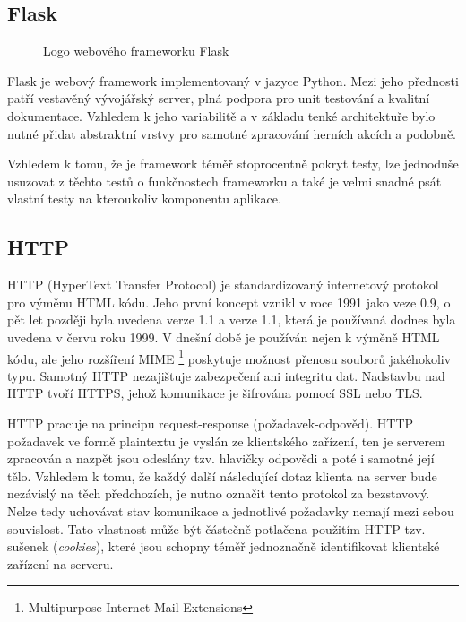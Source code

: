 \subsection{Flask}

\begin{wrapfigure}{R}{\textwidth/3}
    \centering
    
    \caption{Logo webového frameworku Flask}
\end{wrapfigure}

Flask je webový framework implementovaný v jazyce Python. Mezi jeho přednosti patří vestavěný vývojářský server, plná podpora pro unit testování a kvalitní dokumentace. Vzhledem k jeho variabilitě a v základu tenké architektuře bylo nutné přidat abstraktní vrstvy pro samotné zpracování herních akcích a podobně.

Vzhledem k tomu, že je framework téměř stoprocentně pokryt testy, lze jednoduše usuzovat z těchto testů o funkčnostech frameworku a také je velmi snadné psát vlastní testy na kteroukoliv komponentu aplikace.

\subsection{HTTP}

HTTP (HyperText Transfer Protocol) je standardizovaný internetový protokol pro výměnu HTML kódu. Jeho první koncept vznikl v roce 1991 jako veze 0.9, o pět let později byla uvedena verze 1.1 a verze 1.1, která je používaná dodnes byla uvedena v červu roku 1999. V dnešní době je používán nejen k výměně HTML kódu, ale jeho rozšíření MIME \footnote{Multipurpose Internet Mail Extensions} poskytuje možnost přenosu souborů jakéhokoliv typu. Samotný HTTP nezajištuje zabezpečení ani integritu dat. Nadstavbu nad HTTP tvoří HTTPS, jehož komunikace je šifrována pomocí SSL nebo TLS.

HTTP pracuje na principu request-response (požadavek-odpověd). HTTP požadavek ve formě plaintextu je vyslán ze klientského zařízení, ten je serverem zpracován a nazpět jsou odeslány tzv. hlavičky odpovědi a poté i samotné její tělo. Vzhledem k tomu, že každý další následující dotaz klienta na server bude nezávislý na těch předchozích, je nutno označit tento protokol za bezstavový. Nelze tedy uchovávat stav komunikace a jednotlivé požadavky nemají mezi sebou souvislost. Tato vlastnost může být částečně potlačena použitím HTTP tzv. sušenek (\emph{cookies}), které jsou schopny téměř jednoznačně identifikovat klientské zařízení na serveru.

